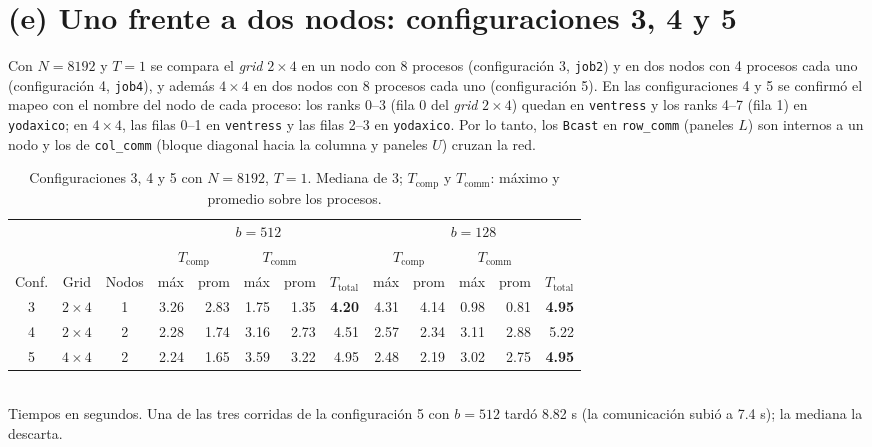 \documentclass[11pt,a4paper]{article}
\newcommand{\Tcomp}{T_{\text{comp}}}
\newcommand{\Tcomm}{T_{\text{comm}}}
\newcommand{\Ttot}{T_{\text{total}}}
\begin{document}
\section{(e) Uno frente a dos nodos: configuraciones 3, 4 y 5}
Con $N=8192$ y $T=1$ se compara el \emph{grid} $2\times4$ en un nodo con 8 procesos (configuración 3, \texttt{job2}) y en dos nodos con 4 procesos cada uno (configuración 4, \texttt{job4}), y además $4\times4$ en dos nodos con 8 procesos cada uno (configuración 5). En las configuraciones 4 y 5 se confirmó el mapeo con el nombre del nodo de cada proceso: los ranks 0--3 (fila 0 del \emph{grid} $2\times4$) quedan en \texttt{ventress} y los ranks 4--7 (fila 1) en \texttt{yodaxico}; en $4\times4$, las filas 0--1 en \texttt{ventress} y las filas 2--3 en \texttt{yodaxico}. Por lo tanto, los \texttt{Bcast} en \texttt{row\_comm} (paneles $L$) son internos a un nodo y los de \texttt{col\_comm} (bloque diagonal hacia la columna y paneles $U$) cruzan la red.

\begin{table}[H]
\centering\small
\caption{Configuraciones 3, 4 y 5 con $N=8192$, $T=1$. Mediana de 3; $\Tcomp$ y $\Tcomm$: máximo y promedio sobre los procesos.}
\label{tab:e}
\begin{tabular}{ccc|rrrrr|rrrrr}
\toprule
 & & & \multicolumn{5}{c|}{$b=512$} & \multicolumn{5}{c}{$b=128$} \\
 & & & \multicolumn{2}{c}{$\Tcomp$} & \multicolumn{2}{c}{$\Tcomm$} & & \multicolumn{2}{c}{$\Tcomp$} & \multicolumn{2}{c}{$\Tcomm$} & \\
Conf. & Grid & Nodos & máx & prom & máx & prom & $\Ttot$ & máx & prom & máx & prom & $\Ttot$ \\
\midrule
3 & $2\times4$ & 1 & 3.26 & 2.83 & 1.75 & 1.35 & \textbf{4.20} & 4.31 & 4.14 & 0.98 & 0.81 & \textbf{4.95} \\
4 & $2\times4$ & 2 & 2.28 & 1.74 & 3.16 & 2.73 & 4.51 & 2.57 & 2.34 & 3.11 & 2.88 & 5.22 \\
5 & $4\times4$ & 2 & 2.24 & 1.65 & 3.59 & 3.22 & 4.95 & 2.48 & 2.19 & 3.02 & 2.75 & \textbf{4.95} \\
\bottomrule
\end{tabular}\\[2pt]
{\footnotesize Tiempos en segundos. Una de las tres corridas de la configuración 5 con $b=512$ tardó 8.82 s (la comunicación subió a 7.4 s); la mediana la descarta.}
\end{table}
\end{document}
